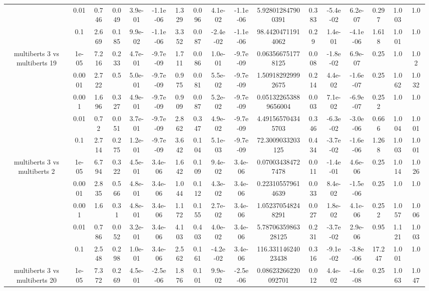 \begin{tabular}{|c|c|c|c|c|c|c|c|c|c|c|c|c|c|c|c|c|}
 & 0.01 & 0.746 & 0.049 & 3.9e-01 & -1.1e-06 & 1.329 & 0.096 & 4.1e-02 & -1.1e-06 & 5.928012847900391 & 0.383 & -5.4e-02 & 6.2e-07 & 0.297 & 1.003 & 1.0 \\
 & 0.1 & 2.669 & 0.185 & 9.9e-02 & -1.1e-06 & 3.352 & 0.087 & -2.4e-02 & -1.1e-06 & 98.44204711914062 & 0.29 & 1.4e-01 & -4.1e-06 & 1.618 & 1.001 & 1.0 \\
\hline
\multirow{5}{*}{multiberts 3 vs multiberts 19} & 1e-05 & 7.216 & 0.233 & 4.7e-01 & -9.7e-09 & 1.711 & 0.086 & 1.0e-01 & -9.7e-09 & 0.063566751778125 & 0.008 & -1.8e-02 & 6.9e-07 & 0.25 & 1.0 & 1.02 \\
 & 0.0001 & 2.722 & 0.5 & 5.0e-01 & -9.7e-09 & 0.975 & 0.081 & 5.5e-02 & -9.7e-09 & 1.509182929992675 & 0.214 & 4.4e-02 & -1.6e-07 & 0.25 & 1.062 & 1.032 \\
 & 0.001 & 1.696 & 0.327 & 4.9e-01 & -9.7e-09 & 0.909 & 0.087 & 5.2e-02 & -9.7e-09 & 0.051322653889656004 & 0.003 & 7.1e-02 & -6.9e-07 & 0.252 & 1.0 & 1.0 \\
 & 0.01 & 0.72 & 0.051 & 3.7e-01 & -9.7e-09 & 2.862 & 0.347 & 4.9e-02 & -9.7e-09 & 4.491565704345703 & 0.346 & -6.3e-02 & -3.0e-06 & 0.666 & 1.004 & 1.001 \\
 & 0.1 & 2.714 & 0.275 & 1.2e-01 & -9.7e-09 & 3.642 & 0.104 & 5.1e-03 & -9.7e-09 & 72.3009033203125 & 0.434 & -3.7e-02 & -1.6e-06 & 1.268 & 1.003 & 1.001 \\
\hline
\multirow{5}{*}{multiberts 3 vs multiberts 2} & 1e-05 & 6.794 & 0.322 & 4.5e-01 & 3.4e-06 & 1.642 & 0.109 & 9.4e-02 & 3.4e-06 & 0.070034384727478 & 0.011 & -1.4e-01 & 4.6e-06 & 0.25 & 1.014 & 1.026 \\
 & 0.0001 & 2.835 & 0.566 & 4.8e-01 & 3.4e-06 & 1.044 & 0.112 & 4.3e-02 & 3.4e-06 & 0.223105579614639 & 0.033 & 8.4e-02 & -1.5e-06 & 0.25 & 1.0 & 1.0 \\
 & 0.001 & 1.6 & 0.31 & 4.8e-01 & 3.4e-06 & 1.172 & 0.155 & 2.7e-02 & 3.4e-06 & 1.052370548248291 & 0.027 & 1.8e-02 & 4.1e-06 & 0.252 & 1.057 & 1.006 \\
 & 0.01 & 0.786 & 0.052 & 3.2e-01 & 3.4e-06 & 4.103 & 0.403 & 4.0e-02 & 3.4e-06 & 5.7870635986328125 & 0.231 & -3.7e-02 & 2.9e-06 & 0.95 & 1.121 & 1.003 \\
 & 0.1 & 2.548 & 0.298 & 1.0e-01 & 3.4e-06 & 2.562 & 0.161 & -4.2e-02 & 3.4e-06 & 116.33114624023438 & 0.316 & -9.1e-02 & -3.8e-06 & 17.247 & 1.001 & 1.0 \\
\hline
\multirow{5}{*}{multiberts 3 vs multiberts 20} & 1e-05 & 7.372 & 0.269 & 4.5e-01 & -2.5e-06 & 1.876 & 0.101 & 9.9e-02 & -2.5e-06 & 0.08623266220092701 & 0.012 & 4.4e-02 & -4.6e-08 & 0.25 & 1.063 & 1.047 \\

\end{tabular}
